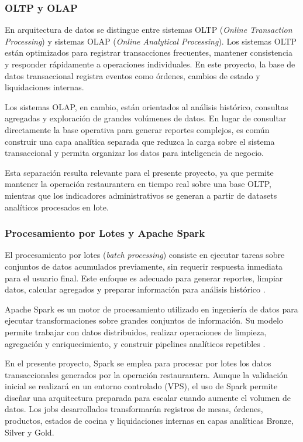 \subsubsection{OLTP y OLAP}

En arquitectura de datos se distingue entre sistemas OLTP (\textit{Online Transaction
Processing}) y sistemas OLAP (\textit{Online Analytical Processing}). Los sistemas OLTP están
optimizados para registrar transacciones frecuentes, mantener consistencia y responder
rápidamente a operaciones individuales. En este proyecto, la base de datos transaccional
registra eventos como órdenes, cambios de estado y liquidaciones internas.

Los sistemas OLAP, en cambio, están orientados al análisis histórico, consultas agregadas
y exploración de grandes volúmenes de datos. En lugar de consultar directamente la base
operativa para generar reportes complejos, es común construir una capa analítica separada
que reduzca la carga sobre el sistema transaccional y permita organizar los datos para
inteligencia de negocio.

Esta separación resulta relevante para el presente proyecto, ya que permite mantener la
operación restaurantera en tiempo real sobre una base OLTP, mientras que los indicadores
administrativos se generan a partir de datasets analíticos procesados en lote.

\subsubsection{Procesamiento por Lotes y Apache Spark}

El procesamiento por lotes (\textit{batch processing}) consiste en ejecutar tareas sobre
conjuntos de datos acumulados previamente, sin requerir respuesta inmediata para el usuario
final. Este enfoque es adecuado para generar reportes, limpiar datos, calcular agregados y
preparar información para análisis histórico \cite{kleppmann2017designing}.

Apache Spark es un motor de procesamiento utilizado en ingeniería de datos para ejecutar
transformaciones sobre grandes conjuntos de información. Su modelo permite trabajar con
datos distribuidos, realizar operaciones de limpieza, agregación y enriquecimiento, y
construir pipelines analíticos repetibles \cite{zaharia2012resilient, chambers2018spark}.

En el presente proyecto, Spark se emplea para procesar por lotes los datos transaccionales
generados por la operación restaurantera. Aunque la validación inicial se realizará en un
entorno controlado (VPS), el uso de Spark permite diseñar una arquitectura preparada para
escalar cuando aumente el volumen de datos. Los jobs desarrollados transformarán registros
de mesas, órdenes, productos, estados de cocina y liquidaciones internas en capas analíticas
Bronze, Silver y Gold.

